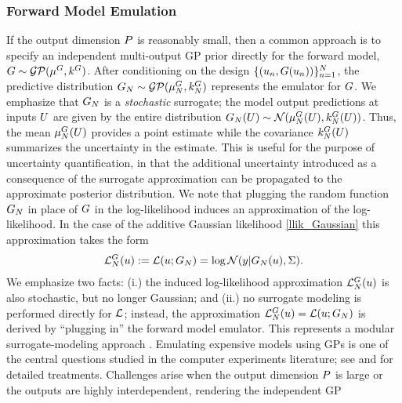 \documentclass[12pt]{article}
\begin{document}
\subsubsection{Forward Model Emulation}
If the output dimension $\dimObs$ is reasonably small, then a common approach is to specify an independent 
multi-output GP prior directly for the forward model, $\fwd \sim \GP(\emMeanPrior{\fwd}, \emKerPrior{\fwd})$. After 
conditioning on the design $\{(\Par_{\idxDesign}, \fwd(\Par_{\idxDesign}))\}_{\idxDesign=1}^{\Ndesign}$, 
the predictive distribution $\fwdEm[\Ndesign] \sim \GP(\emMean[\Ndesign]{\fwd}, \emKer[\Ndesign]{\fwd})$ 
represents the emulator for $\fwd$. We emphasize that $\fwdEm[\Ndesign]$ is a \textit{stochastic} surrogate; 
the model output predictions at inputs $\parMat$ are given by the entire distribution 
$\fwdEm[\Ndesign](\parMat) \sim \Gaussian(\emMean[\Ndesign]{\fwd}(\parMat), \emKer[\Ndesign]{\fwd}(\parMat))$. 
Thus, the mean $\emMean[\Ndesign]{\fwd}(\parMat)$ provides a point estimate while the covariance 
$\emKer[\Ndesign]{\fwd}(\parMat)$ summarizes the uncertainty in the estimate. This is useful for the purpose
of uncertainty quantification, in that the additional uncertainty introduced as a consequence of the surrogate 
approximation can be propagated to the approximate posterior distribution. We note that plugging the random 
function $\fwdEm[\Ndesign]$ in place of $\fwd$ in the log-likelihood induces an approximation of the log-likelihood. 
In the case of the additive Gaussian likelihood \ref{llik_Gaussian} this approximation takes the form 
\begin{align}
\llikEmFwd(\Par) := \llik(\Par; \fwdEm) =  \log\Gaussian(\obs| \fwdEm[\Ndesign](\Par), \likPar). \label{induced_llik_emulator}
\end{align}
We emphasize two facts: (i.) the induced log-likelihood approximation $\llikEmFwd[\Ndesign](\Par)$ is also 
stochastic, but no longer Gaussian; and (ii.) no surrogate modeling is performed directly for $\llik$; instead, 
the approximation $\llikEmFwd[\Ndesign](\Par) = \llik(\Par; \fwdEm[\Ndesign])$ is derived by ``plugging in'' the 
forward model emulator. This represents a modular surrogate-modeling approach \cite{modularization}. 
Emulating expensive models using GPs is one of the central questions 
studied in the computer experiments literature; see \cite{gramacy2020surrogates} and 
\cite{design_analysis_computer_experiments} for detailed treatments. Challenges arise when the output
dimension $\dimObs$ is large or the outputs are highly interdependent, rendering the independent GP 
\end{document}
